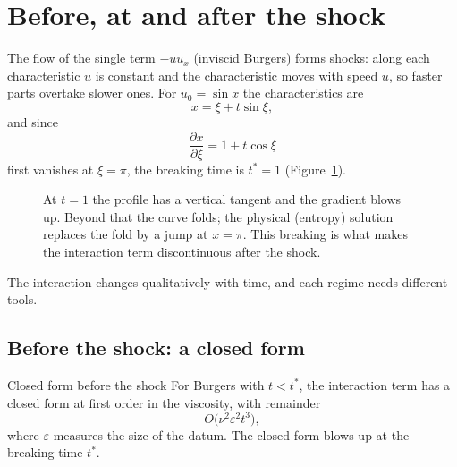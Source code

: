 \section{Before, at and after the shock}

The flow of the single term $-uu_x$ (inviscid Burgers) forms shocks: along each characteristic $u$ is constant and the characteristic moves with speed $u$, so faster parts overtake slower ones. For $u_0=\sin x$ the characteristics are
\[
x=\xi+t\sin\xi,
\]
and since
\[
\frac{\partial x}{\partial\xi}=1+t\cos\xi
\]
first vanishes at $\xi=\pi$, the breaking time is $t^*=1$ (Figure~\ref{fig:burgers}).

\begin{figure}[!htb]
\centering
{}
\caption{At $t=1$ the profile has a vertical tangent and the gradient blows up. Beyond that the curve folds; the physical (entropy) solution replaces the fold by a jump at $x=\pi$. This breaking is what makes the interaction term discontinuous after the shock.}\label{fig:burgers}
\end{figure}

The interaction changes qualitatively with time, and each regime needs different tools.

\subsection{Before the shock: a closed form}

\begin{theorem}{Closed form before the shock  \proved}\label{thm:preshock}
For Burgers with $t<t^*$, the interaction term has a closed form at first order in the viscosity, with remainder
\[
O\big(\nu^2\varepsilon^2t^3\big),
\]
where $\varepsilon$ measures the size of the datum. The closed form blows up at the breaking time $t^*$.

\end{theorem}

